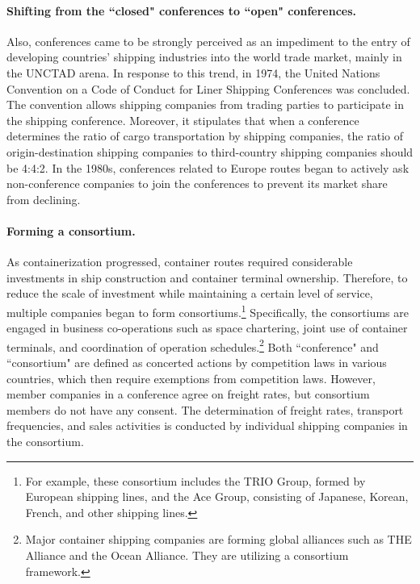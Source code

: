 \documentclass[11pt]{article}
\begin{document}
\paragraph{Shifting from the ``closed" conferences to ``open" conferences.}
Also, conferences came to be strongly perceived as an impediment to the entry of developing countries' shipping industries into the world trade market, mainly in the UNCTAD arena. In response to this trend, in 1974, the United Nations Convention on a Code of Conduct for Liner Shipping Conferences was concluded. The convention allows shipping companies from trading parties to participate in the shipping conference. Moreover, it stipulates that when a conference determines the ratio of cargo transportation by shipping companies, the ratio of origin-destination shipping companies to third-country shipping companies should be 4:4:2. In the 1980s, conferences related to Europe routes began to actively ask non-conference companies to join the conferences to prevent its market share from declining.

\paragraph{Forming a consortium.}
As containerization progressed, container routes required considerable investments in ship construction and container terminal ownership. Therefore, to reduce the scale of investment while maintaining a certain level of service, multiple companies began to form consortiums.\footnote{For example, these consortium includes the TRIO Group, formed by European shipping lines, and the Ace Group, consisting of Japanese, Korean, French, and other shipping lines.} Specifically, the consortiums are engaged in business co-operations such as space chartering, joint use of container terminals, and coordination of operation schedules.\footnote{ Major container shipping companies are forming  global alliances such as THE Alliance and the Ocean Alliance. They are utilizing a consortium framework.} Both ``conference" and ``consortium" are defined as concerted actions by competition laws in various countries, which then require exemptions from competition laws. However, member companies in a conference agree on freight rates, but consortium members do not have any consent. The determination of freight rates, transport frequencies, and sales activities is conducted by individual shipping companies in the consortium.
\end{document}
